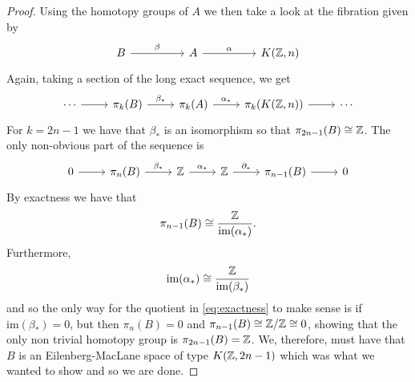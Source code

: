 \documentclass[../main.tex]{subfiles}
\begin{document}
\begin{proof}
   Using the homotopy groups of \( A \) we then take a look at the
   fibration given by
   \begin{equation}
      \begin{tikzcd}
          B && A && {K(\Z, n)}
          \arrow["\beta", from=1-1, to=1-3]
          \arrow["\alpha", from=1-3, to=1-5]
      \end{tikzcd}
   \end{equation}
   Again, taking a section of the long exact sequence, we get
   \begin{equation}
      \begin{tikzcd}
          \cdots & {\pi_k(B)} & {\pi_k(A)} & {\pi_k(K(\Z,n))} & \cdots
          \arrow[from=1-1, to=1-2]
          \arrow["{\beta_*}", from=1-2, to=1-3]
          \arrow["{\alpha_*}", from=1-3, to=1-4]
          \arrow[from=1-4, to=1-5]
      \end{tikzcd}
   \end{equation}
   For \(k =2n-1 \) we have that \( \beta_* \) is an isomorphism
   so that \( \pi_{2n-1}(B)\cong\mathbb{Z} \). The only non-obvious part
   of the sequence is
   \begin{equation}
      \begin{tikzcd}
          0 & {\pi_n(B)} & \Z & \Z & {\pi_{n-1}(B)} & 0
          \arrow[from=1-1, to=1-2]
          \arrow["{\beta_*}", from=1-2, to=1-3]
          \arrow["{\alpha_*}", from=1-3, to=1-4]
          \arrow["{\partial_*}", from=1-4, to=1-5]
          \arrow[from=1-5, to=1-6]
      \end{tikzcd}
   \end{equation}
   By exactness we have that 
   \begin{equation}
      \label{eq:exactness}
      \pi_{n-1}(B)\cong \frac{\mathbb{Z}}{\text{im}(\alpha_*)}.
   \end{equation}
   Furthermore,
   \begin{equation}
      \text{im}(\alpha_*)\cong \frac{\mathbb{Z}}{\text{im}(\beta_*)}
   \end{equation}
   and so the only way for the quotient in \ref{eq:exactness} to make
   sense is if \( \text{im}(\beta_*)=0 \), but then \( \pi_n(B)=0 \)
   and \( \pi_{n-1}(B)\cong \mathbb{Z}/\mathbb{Z} \cong 0 \), showing that the only
   non trivial homotopy group is \( \pi_{2n-1}(B)=\mathbb{Z} \). We, therefore,
   must have that \( B \) is an Eilenberg-MacLane space of type
   \( K(\mathbb{Z}, 2n-1) \) which was what we wanted to show and so we are done.
\end{proof}
\end{document}
